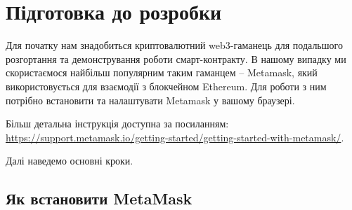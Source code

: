 
\chapter{Підготовка до розробки}
\label{chap:review}  %

Для початку нам знадобиться криптовалютний web3-гаманець для подальшого розгортання та демонстрування роботи смарт-контракту. В нашому випадку ми скористаємося найбільш популярним таким гаманцем -- Metamask, який використовується для взаємодії з блокчейном Ethereum. Для роботи з ним потрібно встановити та налаштувати Metamask у вашому браузері. \par
Більш детальна інструкція доступна за посиланням: \\ \url{https://support.metamask.io/getting-started/getting-started-with-metamask/}. \par
Далі наведемо основні кроки.

\section{Як встановити MetaMask}

